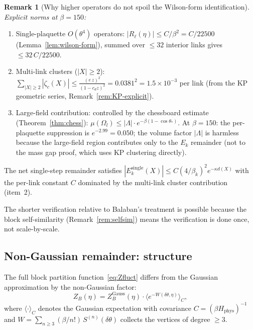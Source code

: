 \documentclass[11pt]{article}
\theoremstyle{definition}
\newtheorem{remark}[theorem]{Remark}
\begin{document}
\begin{remark}[Why higher operators do not spoil the Wilson-form identification]
\emph{Explicit norms at $\beta=150$:}
\begin{enumerate}[nosep]
\item Single-plaquette $O(\theta^4)$ operators:
$|R_\ell(\eta)|\le C/\beta^2=C/22500$
(Lemma~\ref{lem:wilson-form}), summed over $\le 32$
interior links gives
$\le 32\,C/22500$.
\item Multi-link clusters ($|X|\ge 2$):
$\sum_{|X|\ge 2}|\zeta_c(X)|\le\frac{(e\,z)^2}{(1-c_d z)^2}
=0.0381^2=1.5\times 10^{-3}$
per link (from the KP geometric series,
Remark~\ref{rem:KP-explicit}).
\item Large-field contribution:
controlled by the chessboard estimate
(Theorem~\ref{thm:chess}):
$\mu(\Omega_l)\le|\Lambda|\cdot e^{-\beta(1-\cos\theta_*)}$.
At $\beta=150$: the per-plaquette suppression is
$e^{-2.99}=0.050$; the volume factor $|\Lambda|$ is
harmless because the large-field region contributes only to
the $E_k$ remainder (not to the mass gap proof, which uses
KP clustering directly).
\end{enumerate}
The net single-step remainder satisfies
$|E_k^{\mathrm{single}}(X)|\le C(4/\beta_k)^2 e^{-\kappa d(X)}$
with the per-link constant $C$ dominated by the
multi-link cluster contribution (item~2).

The shorter verification relative to Balaban's treatment is possible because the block
self-similarity (Remark~\ref{rem:selfsim}) means the verification
is done once, not scale-by-scale.
\end{remark}

\subsection{Non-Gaussian remainder: structure}\label{subsec:nongauss}

The full block partition function~\eqref{eq:Zfluct} differs from the
Gaussian approximation by the non-Gaussian factor:
\begin{equation}\label{eq:NG}
Z_B(\eta)=Z_B^{\mathrm{Gauss}}(\eta)\cdot
\bigl\langle e^{-W(\delta\theta,\eta)}\bigr\rangle_C,
\end{equation}
where $\langle\cdot\rangle_C$ denotes the Gaussian expectation with
covariance $C=(\beta H_{\mathrm{phys}})^{-1}$ and
$W=\sum_{n\ge 3}(\beta/n!)\,S^{(n)}(\delta\theta)$ collects the
vertices of degree $\ge 3$.
\end{document}

